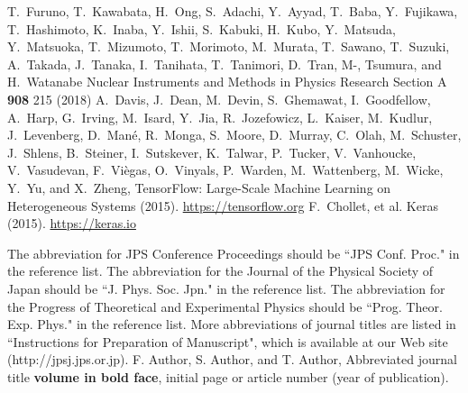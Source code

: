 \documentclass{jps-cp}
\begin{document}
\begin{thebibliography}{9}
  T.~Furuno, T.~Kawabata, H.~Ong, S.~Adachi, Y.~Ayyad, T.~Baba, Y.~Fujikawa, T.~Hashimoto, K.~Inaba, Y.~Ishii,
  S.~Kabuki, H.~Kubo, Y.~Matsuda, Y.~Matsuoka, T.~Mizumoto, T.~Morimoto, M.~Murata, T.~Sawano, T.~Suzuki, A.~Takada,
  J.~Tanaka, I.~Tanihata, T.~Tanimori, D.~Tran, M-, Tsumura, and H.~Watanabe
  Nuclear Instruments and Methods in Physics Research Section A \textbf{908} 215 (2018)
  A.~Davis, J.~Dean, M.~Devin, S.~Ghemawat, I.~Goodfellow, A.~Harp, G.~Irving,
  M.~Isard, Y.~Jia, R.~Jozefowicz, L.~Kaiser, M.~Kudlur, J.~Levenberg,
  D.~Man\'{e}, R.~Monga, S.~Moore, D.~Murray, C.~Olah, M.~Schuster, J.~Shlens,
  B.~Steiner, I.~Sutskever, K.~Talwar, P.~Tucker, V.~Vanhoucke, V.~Vasudevan,
  F.~Vi\`{e}gas, O.~Vinyals, P.~Warden, M.~Wattenberg, M.~Wicke, Y.~Yu, and
  X.~Zheng, {TensorFlow: Large-Scale Machine Learning on Heterogeneous Systems} (2015).
  \url{https://tensorflow.org}
  F.~Chollet, et al. {Keras} (2015). \url{https://keras.io}

 The abbreviation for JPS Conference Proceedings should be ``JPS Conf. Proc." in the reference list.
 The abbreviation for the Journal of the Physical Society of Japan should be ``J. Phys. Soc. Jpn." in the reference list.
 The abbreviation for the Progress of Theoretical and Experimental Physics should be ``Prog. Theor. Exp. Phys." in the reference list.
 More abbreviations of journal titles are listed in ``Instructions for Preparation of Manuscript", which is available at our Web site (http://jpsj.jps.or.jp).
 F. Author, S. Author, and T. Author, Abbreviated journal title \textbf{volume in bold face}, initial page or article number (year of publication).
\end{thebibliography}
\end{document}
